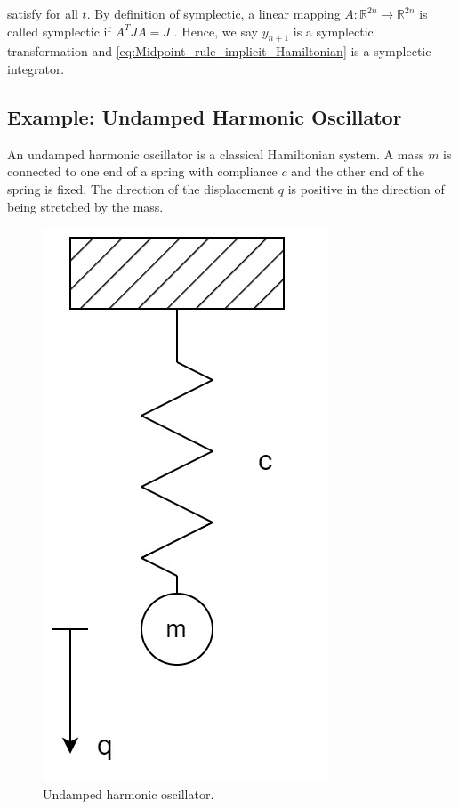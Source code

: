 \documentclass[
	parskip, 			   %
	twoside, 			   %
	DIV=14, 			   %
	BCOR=15.0mm, 		   %
	headsepline, 		   %
	open=right, 		   %
	captions=tableheading, %
	bibliography=totoc,    %
	numbers=noenddot       %
]{scrreprt}
\begin{document}
satisfy for all $t$. By definition of symplectic, a linear mapping $A: \mathbb{R}^{2n} \mapsto \mathbb{R}^{2n}$ is called symplectic if $A^T J A = J$ \cite{hairer2006geometric}. Hence, we say $y_{n+1}$ is a symplectic transformation and \ref{eq:Midpoint_rule_implicit_Hamiltonian} is a symplectic integrator.


\subsection{Example: Undamped Harmonic Oscillator}
An undamped harmonic oscillator is a classical Hamiltonian system. A mass $m$ is connected to one end of a spring with compliance $c$ and the other end of the spring is fixed. The direction of the displacement $q$ is positive in the direction of being stretched by the mass.

\clearpage
\begin{figure}[h!]
    \centering
    \includegraphics[scale=0.3]{figures/undamped harmonic oscillator.jpg}
    \caption{Undamped harmonic oscillator.}
    \label{fig:physical_model_undamped_harmonic_oscillator}
\end{figure}
\end{document}
